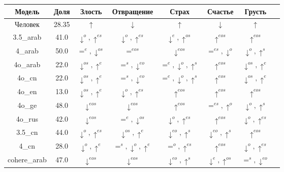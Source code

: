 \begin{small}
\begin{longtable}[c]{|c|c|c|c|c|c|c|c|}
Модель & Доля & Злость & Отвращение & Страх  & Счастье & Грусть \\ \hline \endhead        \hline %
    \endfoot        \hline
    \endlastfoot
Человек        & 28.35  & $\uparrow$ & $\downarrow$ & $\uparrow$ & $\downarrow$ & $\uparrow$ \\        
\hline
3.5\_arab & 41.0 & $\downarrow^{o},\uparrow^{es}$ & $\downarrow^{o},\uparrow^{es}$ & $\downarrow^{e},\uparrow^{os}$ & $\uparrow^{eos}$ & $\uparrow^{eos}$ \\
\hline
4\_arab & 50.0 & $=^{e},\downarrow^{os}$ & $=^{eos}$ & $\downarrow^{eos}$ & $=^{es},\downarrow^{o}$ & $\downarrow^{o},\uparrow^{s}$ \\
\hline
4o\_arab & 22.0 & $\downarrow^{os},\uparrow^{e}$ & $=^{s},\downarrow^{eo}$ & $=^{e},\downarrow^{o},\uparrow^{s}$ & $\uparrow^{eos}$ & $\downarrow^{os},\uparrow^{e}$ \\
\hline
4o\_cn & 22.0 & $\downarrow^{os},\uparrow^{e}$ & $=^{s},\downarrow^{eo}$ & $=^{e},\downarrow^{o},\uparrow^{s}$ & $\uparrow^{eos}$ & $\downarrow^{os},\uparrow^{e}$ \\
\hline
4o\_en & 13.0 & $\downarrow^{os},\uparrow^{e}$ & $\downarrow^{o},\uparrow^{es}$ & $\uparrow^{eos}$ & $\uparrow^{eos}$ & $\uparrow^{eos}$ \\
\hline
4o\_ge & 48.0 & $\downarrow^{eos}$ & $\downarrow^{eos}$ & $\uparrow^{eos}$ & $=^{es},\uparrow^{o}$ & $\downarrow^{o},\uparrow^{s}$ \\
\hline
4o\_rus & 42.0 & $\downarrow^{eos}$ & $=^{e},\downarrow^{os}$ & $\downarrow^{o},\uparrow^{es}$ & $\uparrow^{eos}$ & $\downarrow^{o},\uparrow^{es}$ \\
\hline
3.5\_cn & 44.0 & $\downarrow^{o},\uparrow^{es}$ & $\downarrow^{os},\uparrow^{e}$ & $\downarrow^{eo},\uparrow^{s}$ & $\downarrow^{eo},\uparrow^{s}$ & $\uparrow^{eos}$ \\
\hline
4\_cn & 28.0 & $\downarrow^{o},\uparrow^{e}$ & $=^{s},\downarrow^{o},\uparrow^{e}$ & $=^{o},\uparrow^{es}$ & $\uparrow^{eos}$ & $\downarrow^{o},\uparrow^{es}$ \\
\hline
cohere\_arab & 47.0 & $\downarrow^{eos}$ & $\downarrow^{eos}$ & $\downarrow^{eo},\uparrow^{s}$ & $\downarrow^{e},\uparrow^{os}$ & $=^{s},\downarrow^{eo}$ \\

\end{longtable}
\end{small}
